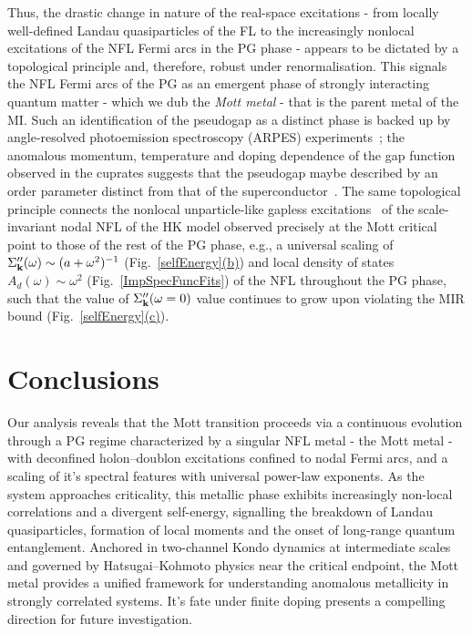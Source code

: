 Thus, the drastic change in nature of the real-space excitations - from locally well-defined Landau quasiparticles of the FL to the increasingly nonlocal excitations of the NFL Fermi arcs in the PG phase - appears to be dictated by a topological principle and, therefore, robust under renormalisation. This signals the NFL Fermi arcs of the PG as an emergent phase of strongly interacting quantum matter - which we dub the {\it Mott metal} - that is the parent metal of the MI. Such an identification of the pseudogap as a distinct phase is backed up by angle-resolved photoemission spectroscopy (ARPES) experiments~\cite{Hashimoto2014}; the anomalous momentum, temperature and doping dependence of the gap function observed in the cuprates suggests that the pseudogap maybe described by an order parameter distinct from that of the superconductor~\cite{Hashimoto2012,Vishik2009}. The same topological principle connects the nonlocal unparticle-like gapless excitations~\cite{Georgi2007PRL,Georgi2007,Phillips2013Unparticles,PhillipsLectures2014} of the scale-invariant nodal NFL of the HK model observed precisely at the Mott critical point to those of the rest of the PG phase, e.g., a universal scaling of $\Sigma''_{{\bf k}}(\omega)\sim (a + \omega^{2})^{-1}$ (Fig.~\hyperref[selfEnergy]{\ref*{selfEnergy}(b)}) and local density of states $A_{d}(\omega) \sim \omega^{2}$ (Fig.~\hyperref[ImpSpecFuncFits]{\ref*{ImpSpecFuncFits}}) of the NFL throughout the PG phase, such that the value of $\Sigma''_{{\bf k}}(\omega=0)$ value continues to grow upon violating the MIR bound (Fig.~\hyperref[selfEnergy]{\ref*{selfEnergy}(c)}). 

\section{Conclusions}\label{tileConclusions}
Our analysis reveals that the Mott transition proceeds via a continuous evolution through a PG regime characterized by a singular NFL metal - the Mott metal - with deconfined holon–doublon excitations confined to nodal Fermi arcs, and a scaling of it's spectral features with universal power-law exponents. As the system approaches criticality, this metallic phase exhibits increasingly non-local correlations and a divergent self-energy, signalling the breakdown of Landau quasiparticles, formation of local moments and the onset of long-range quantum entanglement. Anchored in two-channel Kondo dynamics at intermediate scales and governed by Hatsugai–Kohmoto physics near the critical endpoint, the Mott metal provides a unified framework for understanding anomalous metallicity in strongly correlated systems. It's fate under finite doping presents a compelling direction for future investigation.

